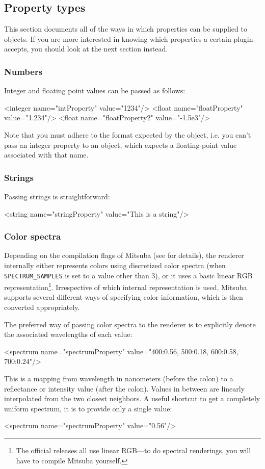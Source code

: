 \subsection{Property types}
This section documents all of the ways in which properties can be supplied to objects. If you are more
interested in knowing which properties a certain plugin accepts, you should look at the next section instead.
\subsubsection{Numbers}
Integer and floating point values can be passed as follows:
\begin{xml}
<integer name="intProperty" value="1234"/>
<float name="floatProperty" value="1.234"/>
<float name="floatProperty2" value="-1.5e3"/>
\end{xml}
Note that you must adhere to the format expected by the object, i.e. you can't pass an integer property
to an object, which expects a floating-point value associated with that name.
\subsubsection{Strings}
Passing strings is straightforward:
\begin{xml}
<string name="stringProperty" value="This is a string"/>
\end{xml}
\subsubsection{Color spectra}
\label{sec:format-spectra}
Depending on the compilation flags of Mitsuba (see  for
details), the renderer internally either represents colors using discretized color spectra
(when \texttt{SPECTRUM\_SAMPLES} is set to a value other than 3), or it
uses a basic linear RGB representation\footnote{The official
releases all use linear RGB---to do spectral renderings, you will have
to compile Mitsuba yourself.}.
Irrespective of which internal representation is used, Mitsuba supports
several different ways of specifying color information, which is then 
converted appropriately.

The preferred way of passing color spectra to the renderer is to explicitly 
denote the  associated wavelengths of each value:
\begin{xml}
<spectrum name="spectrumProperty" value="400:0.56, 500:0.18, 600:0.58, 700:0.24"/>
\end{xml}
This is a mapping from wavelength in nanometers (before the colon) 
to a reflectance or intensity value (after the colon).
Values in between are linearly interpolated from the two closest neighbors.
A useful shortcut to get a completely uniform spectrum, it is to provide 
only a single value:
\begin{xml}
<spectrum name="spectrumProperty" value="0.56"/>
\end{xml}

